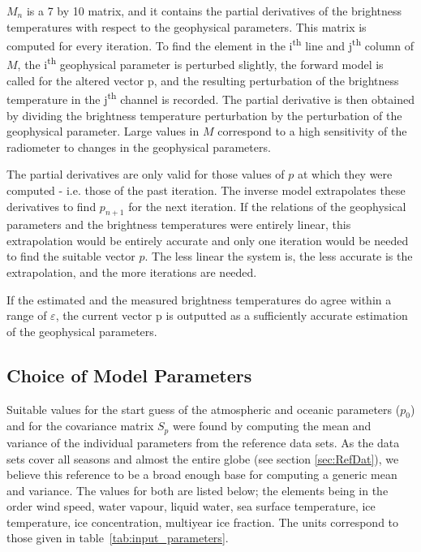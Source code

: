 \documentclass[11pt, a4paper]{article}
\begin{document}
\(M_n\) is a 7 by 10 matrix, and it contains the partial derivatives of the brightness temperatures with respect to the geophysical parameters. This matrix is computed for every iteration. To find the element in the i\textsuperscript{th} line and j\textsuperscript{th} column of \(M\), the i\textsuperscript{th} geophysical parameter is perturbed slightly, the forward model is called for the altered vector p, and the resulting perturbation of the brightness temperature in the j\textsuperscript{th} channel is recorded. The partial derivative is then obtained by dividing the brightness temperature perturbation by the perturbation of the geophysical parameter. Large values in \(M\) correspond to a high sensitivity of the radiometer to changes in the geophysical parameters.
\newline

The partial derivatives are only valid for those values of \(p\) at which they were computed - i.e. those of the past iteration. The inverse model extrapolates these derivatives to find \(p_{n+1}\) for the next iteration. If the relations of the geophysical parameters and the brightness temperatures were entirely linear, this extrapolation would be entirely accurate and only one iteration would be needed to find the suitable vector \(p\). The less linear the system is, the less accurate is the extrapolation, and the more iterations are needed.
\newline

If the estimated and the measured brightness temperatures do agree within a range of \(\varepsilon\), the current vector p is outputted as a sufficiently accurate estimation of the geophysical parameters.


\subsection{Choice of Model Parameters}

Suitable values for the start guess of the atmospheric and oceanic parameters (\(p_0\)) and for the covariance matrix \(S_p\) were found by computing the mean and variance of the individual parameters from the reference data sets. As the data sets cover all seasons and almost the entire globe (see section \ref{sec:RefDat}), we believe this reference to be a broad enough base for computing a generic mean and variance. The values for both are listed below; the elements being in the order wind speed, water vapour, liquid water, sea surface temperature, ice temperature, ice concentration, multiyear ice fraction. The units correspond to those given in \mbox{table \ref{tab:input_parameters}}.
\end{document}
